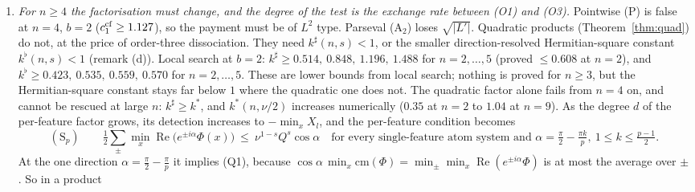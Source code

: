 \documentclass[11pt]{article}
\theoremstyle{definition}
\renewcommand{\Re}{\operatorname{Re}}
\begin{document}
\begin{enumerate}
$|\beta_{l,T}|\big(\varepsilon\sqrt{\kappa_l/2}-\lambda\kappa_l\big)$.  With the proved $\lambda=\frac12$ and $\varepsilon=1$, its ratio to the payment
is $\sqrt{2/\kappa_l}-1$, which tends to $0$ as $\kappa_l\to2$; in the worst direction the surplus is $O(p^{-2})$.  With the sharp
single-feature constant $c_1(2,s)=1-3^{1-s}$ (Theorem~\ref{thm:c1sharp}), concavity in $\kappa$ gives a surplus of at least
$(\varepsilon-2c_1)\frac{\kappa_l}2|\beta_{l,T}|$ in every direction: $18\%$ of the payment at $b=2$, $\varepsilon=1$.  This surplus is the common currency: relations are absorbed by lowering
$\varepsilon$ (or by Fej\'er kernels), unpaid compensation by the residual of the game above, and both have to fit inside it.  With linear tests a
uniform surplus needs the sharp pointwise constant at $n=2$, a single-feature statement of type (P).  Quadratic tests give one from Theorem A
alone: at least $39\%$ of the detection, in class $\mathcal C$ under (D$_3$) (Corollary~\ref{cor:quad} and remark (a)).
\item \emph{For $n\ge4$ the factorisation must change, and the degree of the test is the exchange rate between (O1) and (O3).}  Pointwise
(P) is false at $n=4$, $b=2$ ($c_1^{\rm cf}\ge1.127$), so the payment must be of $L^2$ type.  Parseval (A$_2$) loses $\sqrt{|L'|}$.  Quadratic
products (Theorem~\ref{thm:quad}) do not, at the price of order-three dissociation.  They need $k^\sharp(n,s)<1$, or the smaller
direction-resolved Hermitian-square constant $k^\flat(n,s)<1$ (remark (d)).  Local search at $b=2$: $k^\sharp\ge0.514,\ 0.848,\ 1.196,\ 1.488$ for $n=2,\dots,5$ (proved $\le0.608$ at $n=2$), and $k^\flat\ge0.423,\ 0.535,\ 0.559,\ 0.570$ for $n=2,\dots,5$.  These are lower bounds from local search; nothing is proved for $n\ge3$, but the Hermitian-square constant stays far below $1$ where the quadratic one does not.  The quadratic factor alone fails from
$n=4$ on, and cannot be rescued at large $n$: $k^\sharp\ge k^*$, and $k^*(n,\nu/2)$ increases numerically ($0.35$ at $n=2$ to $1.04$ at $n=9$).  As the degree $d$ of the per-feature factor grows, its
detection increases to $-\min_xX_l$, and the per-feature condition becomes
\[(\mathrm S_p)\qquad\tfrac12\textstyle\sum_\pm\min_x\Re\big(e^{\pm i\alpha}\Phi(x)\big)\ \le\ \nu^{1-s}Q^s\cos\alpha\quad\text{for every single-feature atom system and }\alpha=\tfrac\pi2-\tfrac{\pi k}p,\ 1\le k\le\tfrac{p-1}2 .\]
At the one direction $\alpha=\frac\pi2-\frac\pi p$ it implies (Q1), because $\cos\alpha\,\min_x\mathrm{cm}(\Phi)=\min_\pm\min_x\Re(e^{\pm i\alpha}\Phi)$ is at most the average over $\pm$.  So in a product

\end{enumerate}
\end{document}
